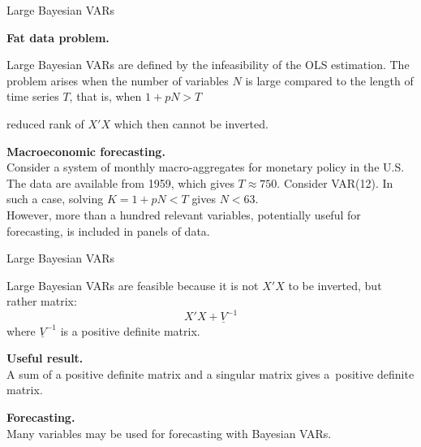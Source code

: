 \documentclass[notes,blackandwhite,mathsans,usenames,dvipsnames]{beamer}
\begin{document}
\begin{frame}{Large Bayesian VARs}

\textbf{Fat data problem.}

{\color{mcxs2}Large Bayesian VARs are defined by the infeasibility of the OLS estimation. The problem arises when the number of variables} $N$ {\color{mcxs2}is large compared to the length of time series} $T${\color{mcxs2}, that is, when} $1+pN>T$

 {\color{purple}reduced rank} {\color{mcxs2}of} $X'X$ {\color{mcxs2}which then cannot be inverted.}

\bigskip
\textbf{Macroeconomic forecasting.}\\
{\color{mcxs2}Consider a system of monthly macro-aggregates for monetary policy in the U.S. The data are available from} 1959{\color{mcxs2}, which gives} $T\approx750$. {\color{mcxs2}Consider VAR(12). In such a case, solving} $K=1+pN<T$ {\color{mcxs2}gives} $N<63$.\\ 
{\color{mcxs2}However, more than a hundred relevant variables, potentially useful for forecasting, is included in panels of data.}
\end{frame}





\begin{frame}{Large Bayesian VARs}

{\color{mcxs2}Large Bayesian VARs are feasible because it is not} $X'X$ {\color{mcxs2}to be inverted, but rather matrix:}
$$ X'X + \underline{V}^{-1} $$
{\color{mcxs2}where} $\underline{V}^{-1}$ {\color{mcxs2}is a positive definite matrix.}

\bigskip 
\textbf{Useful result.}\\
{\color{mcxs2}A sum of a positive definite matrix and a singular matrix gives a~positive definite matrix.}

\bigskip\textbf{Forecasting.}\\
{\color{mcxs2}Many variables may be used for forecasting with Bayesian VARs.}

\end{frame}
\end{document}
